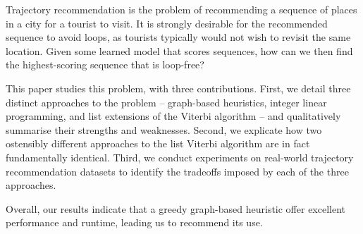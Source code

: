 
Trajectory recommendation is the problem of recommending a sequence of places in a city for a tourist to visit.
It is strongly desirable for the recommended sequence to avoid loops, as tourists typically would not wish to revisit the same location.
Given some learned model that scores sequences, how can we then find the highest-scoring sequence that is loop-free?

This paper studies this problem, with three contributions.
First, we detail three distinct approaches to the problem -- 
graph-based heuristics,
integer linear programming, and
list extensions of the Viterbi algorithm
-- and qualitatively summarise their strengths and weaknesses.
Second, we explicate how two ostensibly different approaches to the list Viterbi algorithm are in fact fundamentally identical.
Third, we conduct experiments on real-world trajectory recommendation datasets to identify the tradeoffs imposed by each of the three approaches.

Overall, our results indicate that a greedy graph-based heuristic offer excellent performance and runtime, leading us to recommend its use.

